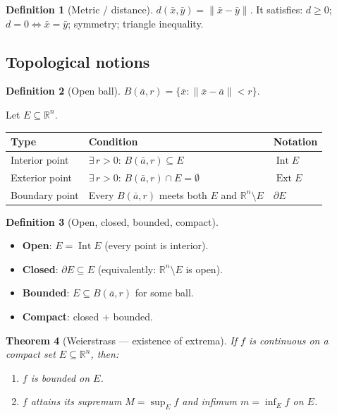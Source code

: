 \documentclass[12pt,a4paper]{article}
\newtheorem{theorem}{Theorem}[section]
\theoremstyle{definition}
\newtheorem{definition}[theorem]{Definition}
\theoremstyle{remark}
\newcommand{\R}{\mathbb{R}}
\newcommand{\xbar}{\bar{x}}
\newcommand{\abar}{\bar{a}}
\begin{document}
\begin{definition}[Metric / distance]
$d(\xbar,\bar{y})=\|\xbar-\bar{y}\|$.  It satisfies: $d\ge 0$; $d=0\iff\xbar=\bar{y}$; symmetry; triangle inequality.
\end{definition}

\subsection*{Topological notions}

\begin{definition}[Open ball]
$B(\abar,r)=\{\xbar:\|\xbar-\abar\|<r\}$.
\end{definition}

Let $E\subseteq\R^n$.
\begin{center}
\renewcommand{\arraystretch}{1.4}
\begin{tabular}{lll}
\toprule
Type & Condition & Notation\\
\midrule
Interior point & $\exists\,r>0:\,B(\abar,r)\subseteq E$ & $\operatorname{Int}E$\\
Exterior point & $\exists\,r>0:\,B(\abar,r)\cap E=\emptyset$ & $\operatorname{Ext}E$\\
Boundary point & Every $B(\abar,r)$ meets both $E$ and $\R^n\setminus E$ & $\partial E$\\
\bottomrule
\end{tabular}
\end{center}

\begin{definition}[Open, closed, bounded, compact]
\begin{itemize}
  \item \textbf{Open}: $E=\operatorname{Int}E$ (every point is interior).
  \item \textbf{Closed}: $\partial E\subseteq E$ (equivalently: $\R^n\setminus E$ is open).
  \item \textbf{Bounded}: $E\subseteq B(\abar,r)$ for some ball.
  \item \textbf{Compact}: closed $+$ bounded.
\end{itemize}
\end{definition}

\begin{theorem}[Weierstrass --- existence of extrema]
If $f$ is continuous on a compact set $E\subseteq\R^n$, then:
\begin{enumerate}
  \item $f$ is \emph{bounded} on $E$.
  \item $f$ attains its supremum $M=\sup_E f$ and infimum $m=\inf_E f$ on $E$.
\end{enumerate}
\end{theorem}
\end{document}
